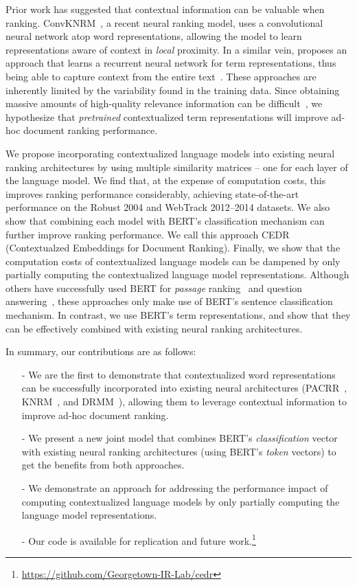 \documentclass[sigconf]{acmart}
\begin{document}
Prior work has suggested that contextual information can be valuable when ranking.
ConvKNRM~\cite{Dai2018ConvolutionalNN}, a recent neural ranking model, uses a convolutional neural network atop word representations, allowing the model to learn representations aware of context in \textit{local} proximity. In a similar vein, \citet{McDonald2018DeepRR} proposes an approach that learns a recurrent neural network for term representations, thus being able to capture context from the entire text~\cite{McDonald2018DeepRR}. These approaches are inherently limited by the variability found in the training data. Since obtaining massive amounts of high-quality relevance information can be difficult~\cite{Zamani2018SIGIR2W}, we hypothesize that \textit{pretrained} contextualized term representations will improve ad-hoc document ranking performance.

We propose incorporating contextualized language models into existing neural ranking architectures by using multiple similarity matrices -- one for each layer of the language model.
We find that, at the expense of computation costs, this improves ranking performance considerably, achieving state-of-the-art performance on the Robust 2004 and WebTrack 2012--2014 datasets.
We also show that combining each model with BERT's classification mechanism can further improve ranking performance.
We call this approach CEDR (Contextualzed Embeddings for Document Ranking).
Finally, we show that the computation costs of contextualized language models can be dampened by only partially computing the contextualized language model representations.
Although others have successfully used BERT for \textit{passage} ranking~\cite{Nogueira2019PassageRW} and question answering~\cite{2019EndtoEndOQ}, these approaches only make use of BERT's sentence classification mechanism. In contrast, we use BERT's term representations, and show that they can be effectively combined with existing neural ranking architectures.

In summary, our contributions are as follows:
\begin{enumerate}[noitemsep,topsep=0pt,leftmargin=*]
\item[-] We are the first to demonstrate that contextualized word representations can be successfully incorporated into existing neural architectures (PACRR~\cite{Hui2018CoPACRRAC}, KNRM~\cite{Xiong2017EndtoEndNA}, and DRMM~\cite{Guo2016ADR}), allowing them to leverage contextual information to improve ad-hoc document ranking.
\item[-] We present a new joint model that combines BERT's \textit{classification} vector with existing neural ranking architectures (using BERT's \textit{token} vectors) to get the benefits from both approaches.
\item[-] We demonstrate an approach for addressing the performance impact of computing contextualized language models by only partially computing the language model representations.
\item[-] Our code is available for replication and future work.\footnote{\url{https://github.com/Georgetown-IR-Lab/cedr}}
\end{enumerate}
\end{document}

